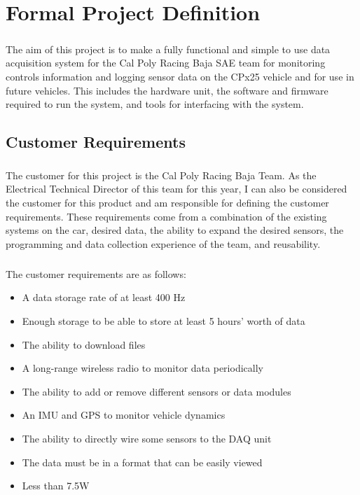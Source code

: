 \chapter{Formal Project Definition}

\paragraph{}
The aim of this project is to make a fully functional and simple to use data acquisition system for the Cal Poly Racing Baja SAE team for monitoring controls information and logging sensor data on the CPx25 vehicle and for use in future vehicles.
This includes the hardware unit, the software and firmware required to run the system, and tools for interfacing with the system.

\section{Customer Requirements}

\paragraph{}
The customer for this project is the Cal Poly Racing Baja Team.
As the Electrical Technical Director of this team for this year, I can also be considered the customer for this product and am responsible for defining the customer requirements.
These requirements come from a combination of the existing systems on the car, desired data, the ability to expand the desired sensors, the programming and data collection experience of the team, and reusability.

\paragraph{}
The customer requirements are as follows:
\begin{itemize}
	\item A data storage rate of at least 400 Hz
	\item Enough storage to be able to store at least 5 hours' worth of data
	\item The ability to download files
	\item A long-range wireless radio to monitor data periodically
	\item The ability to add or remove different sensors or data modules
	\item An IMU and GPS to monitor vehicle dynamics
	\item The ability to directly wire some sensors to the DAQ unit
	\item The data must be in a format that can be easily viewed
	\item Less than 7.5W
\end{itemize}

